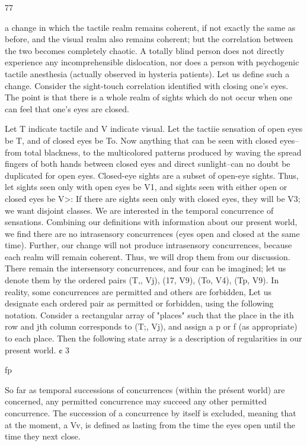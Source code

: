 \documentclass[10pt,twoside]{memoir}
\begin{document}
\begin{enumerate}
{{{{{{{{{{{{{{{77 


a change in which the tactile realm remains coherent, if not exactly the same 
as before, and the visual realm also remains coherent; but the correlation 
between the two becomes completely chaotic. A totally blind person does 
not directly experience any incomprehensible dislocation, nor does a person 
with psychogenic tactile anesthesia (actually observed in hysteria patients). 
Let us define such a change. Consider the sight-touch correlation identified 
with closing one's eyes. The point is that there is a whole realm of sights 
which do not occur when one can feel that one's eyes are closed. 

Let T indicate tactile and V indicate visual. Let the tactiie sensation of 
open eyes be T, and of closed eyes be To. Now anything that can be seen 
with closed eyes--from total blackness, to the multicolored patterns produced 
by waving the spread fingers of both hands between closed eyes and direct 
sunlight--can no doubt be duplicated for open eyes. Closed-eye sights are a 
subset of open-eye sights. Thus, let sights seen only with open eyes be V1, 
and sights seen with either open or closed eyes be V>: If there are sights seen 
only with closed eyes, they will be V3; we want disjoint classes. We are 
interested in the temporal concurrence of sensations. Combining our 
definitions with information about our present world, we find there are no 
intrasensory concurrences (eyes open and closed at the same time). Further, 
our change will not produce intrasensory concurrences, because each realm 
will remain coherent. Thus, we will drop them from our discussion. There 
remain the intersensory concurrences, and four can be imagined; let us 
denote them by the ordered pairs (T,, Vj), (17, V9), (To, V4), (Tp, V9). In 
reality, some concurrences are permitted and others are forbidden, Let us 
designate each ordered pair as permitted or forbidden, using the following 
notation. Consider a rectangular array of "places" such that the place in the 
ith row and jth column corresponds to (T;, Vj), and assign a p or f (as 
appropriate) to each place. Then the following state array is a description of 
regularities in our present world. ¢ 3 


fp 


So far as temporal successions of concurrences (within the présent 
world) are concerned, any permitted concurrence may succeed any other 
permitted concurrence. The succession of a concurrence by itself is 
excluded, meaning that at the moment, a Vv, is defined as lasting from the 
time the eyes open until the time they next close. 

}}}}}}}}}}}}}}}
\end{enumerate}
\end{document}
